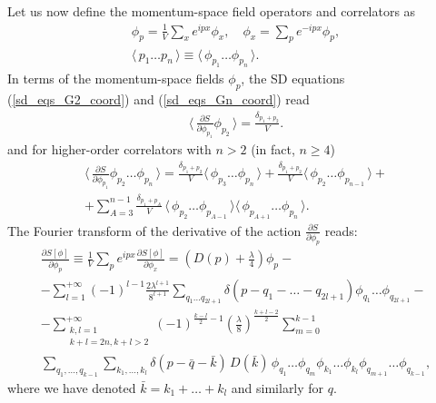 \documentclass[12pt]{article}
\newcommand{\lr}[1]{ \left( #1 \right) }
\newcommand{\lrs}[1]{ \left[ #1 \right] }
\newcommand{\vev}[1]{ \langle \, #1 \, \rangle }
\begin{document}
 Let us now define the momentum-space field operators and correlators as
\begin{eqnarray}
\label{momentum_space_fields}
 \phi_p = \frac{1}{V} \sum\limits_x e^{i p x} \phi_x,
 \quad
 \phi_x = \sum\limits_p e^{-i p x} \phi_p ,
 \nonumber \\
 \vev{p_1 \ldots p_n} \equiv \vev{\phi_{p_1} \ldots \phi_{p_n}} .
\end{eqnarray}
In terms of the momentum-space fields $\phi_p$, the SD equations (\ref{sd_eqs_G2_coord}) and (\ref{sd_eqs_Gn_coord}) read
\begin{eqnarray}
\label{sd_eqs_G2_mom}
 \vev{\frac{\partial S}{\partial \phi_{p_1}} \phi_{p_2} } = \frac{\delta_{p_1 + p_2}}{V}  .
\end{eqnarray}
and for higher-order correlators with $n > 2$ (in fact, $n \geq 4$)
\begin{eqnarray}
\label{sd_eqs_Gn_mom}
 \vev{\frac{\partial S}{\partial \phi_{p_1}} \phi_{p_2} \ldots \phi_{p_n} }
 =
 \frac{\delta_{p_1 + p_2}}{V} \vev{\phi_{p_3} \ldots \phi_{p_n}}
 +
 \frac{\delta_{p_1 + p_2}}{V} \vev{\phi_{p_2} \ldots \phi_{p_{n-1}}}
 + \nonumber \\ +
 \sum\limits_{A=3}^{n-1} \frac{\delta_{p_1 + p_A}}{V} \,
 \vev{\phi_{p_2} \ldots \phi_{p_{A-1}}}
 \vev{\phi_{p_{A+1}} \ldots \phi_{p_n}} .
\end{eqnarray}
The Fourier transform of the derivative of the action $\frac{\partial S}{\partial \phi_p}$ reads:
\begin{eqnarray}
\label{dSdphi_mom}
 \frac{\partial S\lrs{\phi}}{\partial \phi_p}
 \equiv
 \frac{1}{V} \sum\limits_p e^{i p x} \frac{\partial S\lrs{\phi}}{\partial \phi_x}
 =
 \lr{D\lr{p} + \frac{\lambda}{4}} \phi_p
 - \nonumber \\ -
 \sum\limits_{l=1}^{+\infty} \lr{-1}^{l-1} \frac{2 \lambda^{l+1}}{8^{l+1}}
 \sum\limits_{q_1 \ldots q_{2 l + 1}}
 \delta\lr{p - q_1 - \ldots - q_{2 l + 1}}
 \phi_{q_1} \ldots \phi_{q_{2 l + 1}}
 - \nonumber \\ -
 \sum\limits_{\substack{k,l=1\\k+l=2 n,k+l>2}}^{+\infty}
 \lr{-1}^{\frac{k-l}{2}-1} \lr{\frac{\lambda}{8}}^{\frac{k+l-2}{2}}
 \sum\limits_{m=0}^{k-1}
 \nonumber \\
 \sum\limits_{q_1, \ldots, q_{k-1}}
 \sum\limits_{k_1, \ldots, k_l}
 \delta\lr{p - \bar{q} - \bar{k}} \, D\lr{\bar{k}} \,
 \phi_{q_1} \ldots \phi_{q_m}
 \phi_{k_1} \ldots \phi_{k_l}
 \phi_{q_{m+1}} \ldots \phi_{q_{k-1}} ,
\end{eqnarray}
where we have denoted $\bar{k} = k_1 + \ldots + k_l$ and similarly for $q$.
\end{document}
